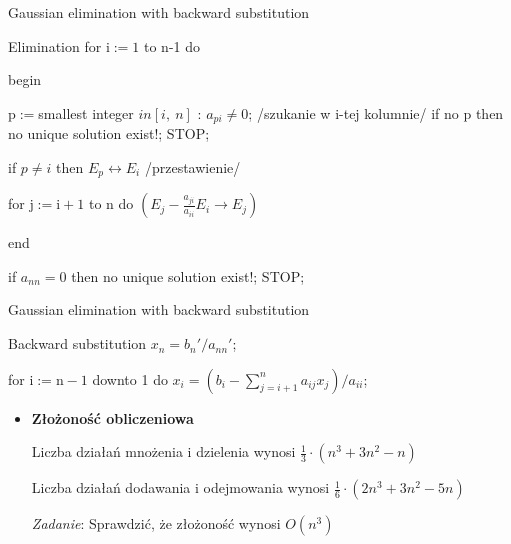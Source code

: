 \begin{frame}{Gaussian elimination with backward substitution}
\begin{exampleblock}{Elimination}
for $\mathrm{i}:=1$ to n-1 do

\hspace{4mm} begin

\hspace{7mm} $\mathrm{p}:=$smallest integer $in[i,\ n]$ : $a_{pi}\neq 0$; /szukanie w i-tej 
\hspace*{7mm} kolumnie/ \newline
\hspace*{7mm} if no $\mathrm{p}$ then no unique solution exist!; STOP;

\hspace{7mm} if $p\neq i$ then $E_{p}\leftrightarrow E_{i}$ /przestawienie/

\hspace{7mm} for $\mathrm{j}:=\mathrm{i}+1$ to $\mathrm{n}$ do $(E_{j}-\displaystyle \frac{a_{ji}}{a_{ii}}E_i\rightarrow E_{j})$

\hspace{4mm} end

if $a_{nn}=0$ then no unique solution exist!; STOP;
    	\end{exampleblock}

\end{frame}
\begin{frame}{Gaussian elimination with backward substitution}
\begin{exampleblock}{Backward substitution}
$x_{n}=b_{n}'/a_{nn}'$;

for $\mathrm{i}:=\mathrm{n}-1$ downto 1 do $x_{i}=(b_{i}-\displaystyle \sum_{j=i+1}^{n}a_{ij}x_{j})/a_{ii}$;
\end{exampleblock}

\begin{itemize}
\item \textbf{Złożoność obliczeniowa}

Liczba działań mnożenia $\mathrm{i}$ dzielenia wynosi $\displaystyle \frac{1}{3}\cdot(n^{3}+3n^{2}-n)$

Liczba działań dodawania $\mathrm{i}$ odejmowania wynosi $\displaystyle \frac{1}{6}\cdot(2n^{3}+3n^{2}-5n)$

\begin{flushright}
{\it Zadanie}: Sprawdzić, że złożoność wynosi $O(n^{3})$
\end{flushright} 

\end{itemize}

\end{frame}

